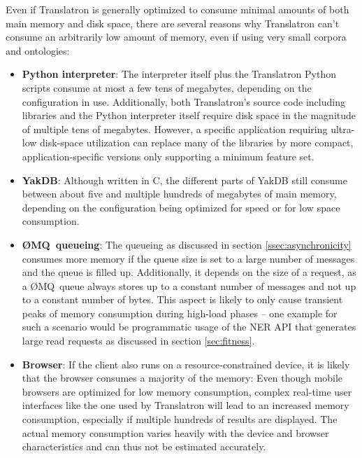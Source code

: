 \documentclass[a4paper, 12pt, twoside, reqn]{report}
\numberwithin{figure}{chapter}
\newtheorem[L]{boxedDefinition}{Definition}
\newtheorem[L]{boxedExample}{Example}
\newcommand{\ZMQ}{{\O}MQ}
\def\CC{{C\nolinebreak[4]\hspace{-.05em}\raisebox{.4ex}{\tiny\bf ++}}}
\begin{document}
Even if Translatron is generally optimized to consume minimal amounts of both main memory and disk space, there are several reasons why Translatron can't consume an arbitrarily low amount of memory, even if using very small corpora and ontologies:
\begin{itemize}
 \item \textbf{Python interpreter}: The interpreter itself plus the Translatron Python scripts consume at most a few tens of megabytes, depending on the configuration in use. Additionally, both Translatron's source code including libraries and the Python interpreter itself require disk space in the magnitude of multiple tens of megabytes. However, a specific application requiring ultra-low disk-space utilization can replace many of the libraries by more compact, application-specific versions only supporting a minimum feature set.
 
 \item \textbf{YakDB}: Although written in \CC, the different parts of YakDB still consume between about five and multiple hundreds of megabytes of main memory, depending on the configuration being optimized for speed or for low space consumption.
 
 \item \textbf{\ZMQ\ queueing}: The queueing as discussed in section \ref{ssec:asynchronicity} consumes more memory if the queue size is set to a large number of messages and the queue is filled up. Additionally, it depends on the size of a request, as a \ZMQ\ queue always stores up to a constant number of messages and not up to a constant number of bytes. This aspect is likely to only cause transient peaks of memory consumption during high-load phases -- one example for such a scenario would be programmatic usage of the NER API that generates large read requests as discussed in section \ref{sec:fitness}.
 
 \item \textbf{Browser}: If the client also runs on a resource-constrained device, it is likely that the browser consumes a majority of the memory: Even though mobile browsers are optimized for low memory consumption, complex real-time user interfaces like the one used by Translatron will lead to an increased memory consumption, especially if multiple hundreds of results are displayed. The actual memory consumption varies heavily with the device and browser characteristics and can thus not be estimated accurately.
\end{itemize}
\end{document}
